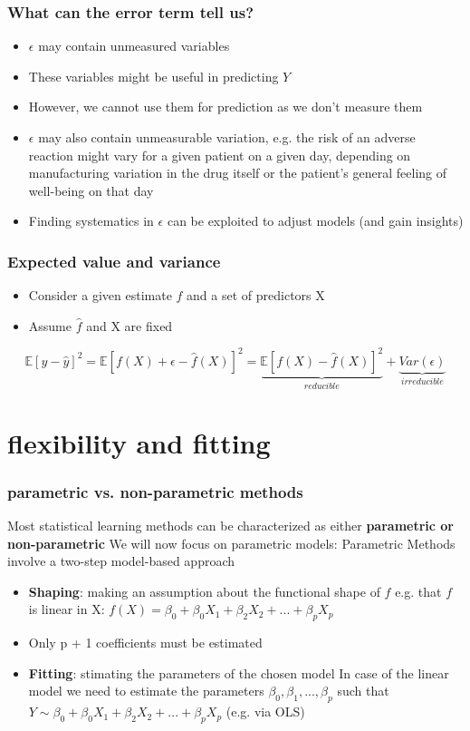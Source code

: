 \documentclass{beamer}
\begin{document}
\begin{frame}
\frametitle{What can the error term tell us?}
\begin{itemize}
\item $\epsilon$ may contain unmeasured variables
\item These variables might be useful in predicting $Y$
\item However, we cannot use them for prediction as we don’t measure them
\item $\epsilon$ may also contain unmeasurable variation, e.g.
the risk of an adverse reaction might vary for a given patient on a given
day, depending on manufacturing variation in the drug itself or the patient’s
general feeling of well-being on that day
\item Finding systematics in $\epsilon$ can be exploited to adjust models (and gain
insights)
\end{itemize}
\end{frame}


\begin{frame}
\frametitle{Expected value and variance}
\begin{itemize}
\item Consider a given estimate $f$ and a set of predictors X
\item Assume $\hat{f}$ and X are fixed
\end{itemize}
\begin{equation*}
\mathbb{E}[y-\hat{y}]^2 = \mathbb{E}[f(X) + \epsilon -\hat{f}(X)]^2  = \underbrace{\mathbb{E}[f(X)-\hat{f}(X) ]^2 }_{reducible}  +\underbrace{Var(\epsilon)}_{irreducible} 
\end{equation*}
\end{frame}

\section{flexibility and fitting}
\begin{frame}
\frametitle{parametric vs. non-parametric methods}
Most statistical learning methods can be characterized as either
\newline
\textbf{ parametric or non-parametric}
\newline
We will now focus on parametric models:
Parametric Methods involve a two-step model-based approach
\begin{itemize}
\item \textbf{Shaping}: making an assumption about the functional shape of $f$
e.g. that $f$ is linear in X: $f(X) = \beta_0 + \beta_0X_1 + \beta_2X_2 + ... + \beta_p X_p$
\item Only p + 1 coefficients must be estimated
\item \textbf{Fitting}: stimating the parameters of the chosen model
\newline
In case of the linear model we need to estimate the parameters $\beta_0 ,‪\beta_1 ,‪...‪,‪\beta_p$ such that $Y \sim \beta_0 + \beta_0X_1 + \beta_2X_2 + ... + \beta_p X_p$  (e.g. via OLS)
\end{itemize}
 
\end{frame}
\end{document}
